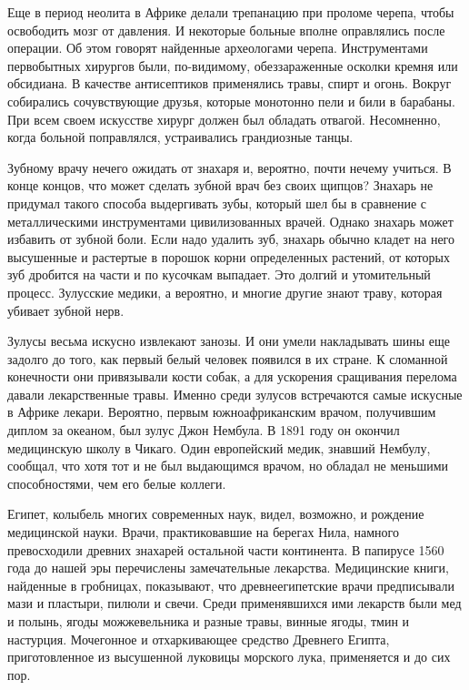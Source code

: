 \documentclass[12pt,a4paper,twoside,openany,svgnames]{memoir}
\begin{document}
Еще в период неолита в Африке делали трепанацию при проломе черепа, чтобы освободить мозг от давления. И некоторые больные вполне оправлялись после операции. Об этом говорят найденные археологами черепа. Инструментами первобытных хирургов были, по-видимому, обеззараженные осколки кремня или обсидиана. В качестве антисептиков применялись травы, спирт и огонь. Вокруг собирались сочувствующие друзья, которые монотонно пели и били в барабаны. При всем своем искусстве хирург должен был обладать отвагой. Несомненно, когда больной поправлялся, устраивались грандиозные танцы.

Зубному врачу нечего ожидать от знахаря и, вероятно, почти нечему учиться. В конце концов, что может сделать зубной врач без своих щипцов? Знахарь не придумал такого способа выдергивать зубы, который шел бы в сравнение с металлическими инструментами цивилизованных врачей. Однако знахарь может избавить от зубной боли. Если надо удалить зуб, знахарь обычно кладет на него высушенные и растертые в порошок корни определенных растений, от которых зуб дробится на части и по кусочкам выпадает. Это долгий и утомительный процесс. Зулусские медики, а вероятно, и многие другие знают траву, которая убивает зубной нерв.

Зулусы весьма искусно извлекают занозы. И они умели накладывать шины еще задолго до того, как первый белый человек появился в их стране. К сломанной конечности они привязывали кости собак, а для ускорения сращивания перелома давали лекарственные травы. Именно среди зулусов встречаются самые искусные в Африке лекари. Вероятно, первым южноафриканским врачом, получившим диплом за океаном, был зулус Джон Нембула. В 1891 году он окончил медицинскую школу в Чикаго. Один европейский медик, знавший Нембулу, сообщал, что хотя тот и не был выдающимся врачом, но обладал не меньшими способностями, чем его белые коллеги.

Египет, колыбель многих современных наук, видел, возможно, и рождение медицинской науки. Врачи, практиковавшие на берегах Нила, намного превосходили древних знахарей остальной части континента. В папирусе 1560 года до нашей эры перечислены замечательные лекарства. Медицинские книги, найденные в гробницах, показывают, что древнеегипетские врачи предписывали мази и пластыри, пилюли и свечи. Среди применявшихся ими лекарств были мед и полынь, ягоды можжевельника и разные травы, винные ягоды, тмин и настурция. Мочегонное и отхаркивающее средство Древнего Египта, приготовленное из высушенной луковицы морского лука, применяется и до сих пор.
\end{document}
